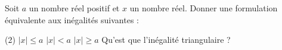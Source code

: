 %
%
	Soit $a$ un nombre réel positif et $x$ un nombre réel. Donner une formulation équivalente aux inégalités suivantes :
	\begin{tasks}(2)
		\task $\mid x \mid \leqslant a$
		\task $\mid x \mid < a$
		\task $\mid x \mid \geqslant a$
		\task Qu'est que l'inégalité triangulaire ?
	\end{tasks}

